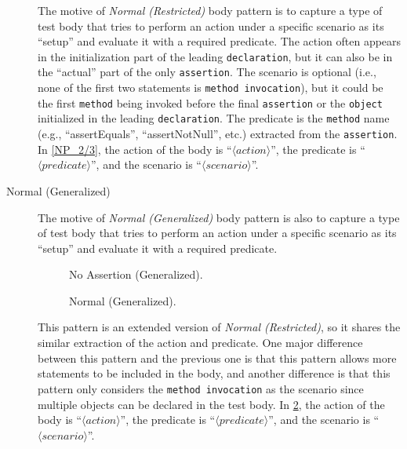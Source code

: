 \documentclass[proposal.tex]{subfiles}
\begin{document}
\begin{description}
The motive of \textit{Normal (Restricted)} body pattern is to capture a type of test body that tries to perform an action under a specific scenario as its \enquote{setup} and evaluate it with a required predicate.
%
The action often appears in the initialization part of the leading \texttt{declaration}, but it can also be in the \enquote{actual} part of the only \texttt{assertion}.
%
The scenario is optional (i.e., none of the first two statements is \texttt{method invocation}), but it could be the first \texttt{method} being invoked before the final \texttt{assertion} or the \texttt{object} initialized in the leading \texttt{declaration}.
%
The predicate is the \texttt{method} name (e.g., \enquote{assertEquals}, \enquote{assertNotNull}, etc.) extracted from the \texttt{assertion}.
%
In \cref{NP_2/3}, the action of the body is \enquote{$\langle action \rangle$}, the predicate is \enquote{$\langle predicate \rangle$}, and the scenario is \enquote{$\langle scenario \rangle$}.


\item[Normal (Generalized)] 


The motive of \textit{Normal (Generalized)} body pattern is also to capture a type of test body that tries to perform an action under a specific scenario as its \enquote{setup} and evaluate it with a required predicate.

\begin{figure}[H]
\centering
    \begin{subfigure}{0.7\textwidth}
    \end{subfigure}
\caption{No Assertion (Generalized).}
\label{NoAstP_any}
\end{figure}
\begin{figure}[H]
\centering
    \begin{subfigure}{0.675\textwidth}
    \end{subfigure}
\caption{Normal (Generalized).}
\label{NP_any}
\end{figure}

This pattern is an extended version of \textit{Normal (Restricted)}, so it shares the similar extraction of the action and predicate.
%
One major difference between this pattern and the previous one is that this pattern allows more statements to be included in the body, and another difference is that this pattern only considers the \texttt{method invocation} as the scenario since multiple objects can be declared in the test body.
%
In \cref{NP_any}, the action of the body is \enquote{$\langle action \rangle$}, the predicate is \enquote{$\langle predicate \rangle$}, and the scenario is \enquote{$\langle scenario \rangle$}.



\end{description}
\end{document}
